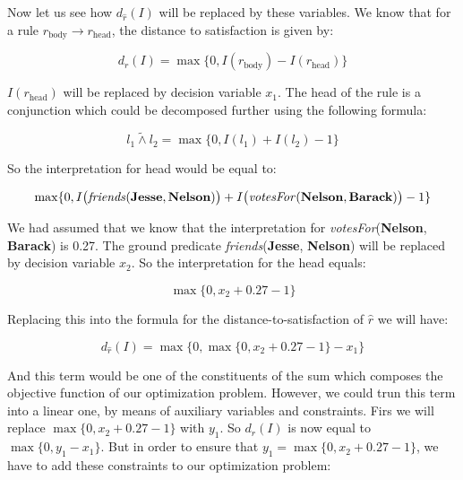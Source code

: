 \documentclass[12pt,a4paper]{article}
\begin{document}
Now let us see how $d_{\hat{r}}(I)$ will be replaced by these variables. We know that for a rule $r_{\text{body}} \to r_{\text{head}}$, the distance to satisfaction is given by:

\begin{equation*}
d_r(I) = \max \{ 0, I(r_{\text{body}}) - I(r_{\text{head}}) \}
\end{equation*} 

$ I(r_{\text{head}}) $ will be replaced by decision variable $x_1$. The head of the rule is a conjunction which could be decomposed further using the following formula:

\begin{equation*}
l_1 \tilde{\land} l_2 = \max \{ 0, I(l_1) + I(l_2) - 1\}
\end{equation*}

So the interpretation for head would be equal to:

\begin{equation*}
\max \{ 0, I \big( \text{\emph{friends}}(\text{\textbf{Jesse}}, \text{\textbf{Nelson}})\big) + I\big(\text{\emph{votesFor}}(\text{\textbf{Nelson}}, \text{\textbf{Barack}})\big) -1 \}
\end{equation*}


We had assumed that we know that the  interpretation for \emph{votesFor}(\textbf{Nelson}, \textbf{Barack}) is 0.27. The ground predicate \emph{friends}(\textbf{Jesse}, \textbf{Nelson}) will be replaced by decision variable $x_2$. So the interpretation for the head equals:

\begin{equation*}
\max \{ 0, x_2 + 0.27 - 1 \}
\end{equation*}

Replacing this into the formula for the distance-to-satisfaction of $\hat{r}$ we will have:

\begin{equation*}
d_{\hat{r}} (I) = \max \{ 0, \max \{ 0 , x_2 + 0.27 - 1 \} - x_1 \}
\end{equation*}

And this term would be one of the constituents of the sum which composes the objective function of our optimization problem. However, we could trun this term into a linear one, by means of auxiliary variables and constraints. Firs we will replace $\max \{ 0 , x_2 + 0.27 - 1 \}$ with $y_1$. So $d_{\hat{r}} (I)$ is now equal to $\max \{ 0, y_1 - x_1 \}$. But in order to ensure that $ y_1 = \max \{ 0 , x_2 + 0.27 - 1 \}$, we have to add these constraints to our optimization problem:
\end{document}
